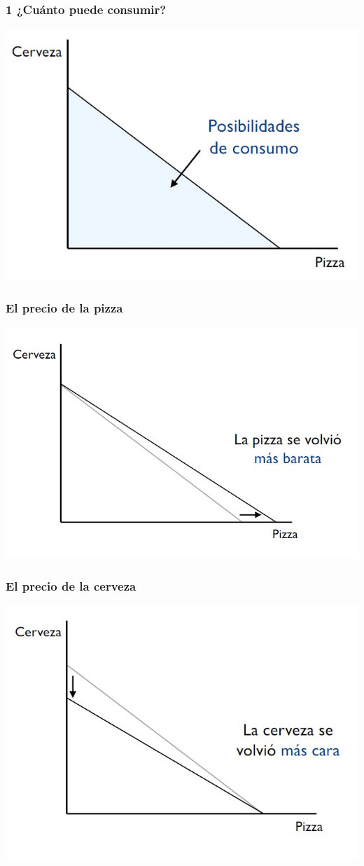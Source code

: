 \documentclass{beamer}
\begin{document}
\begin{frame}
\frametitle{1 ¿Cuánto puede consumir?}
\centering
\includegraphics[scale=0.6]{Figures/Tema_02.5_rp3.jpg}
\end{frame}

\begin{frame}
\frametitle{El precio de la pizza}
\centering
\includegraphics[scale=0.6]{Figures/Tema_02.6_rp4.jpg}
\end{frame}

\begin{frame}
\frametitle{El precio de la cerveza}
\centering
\includegraphics[scale=0.6]{Figures/Tema_02.7_rp5.jpg}
\end{frame}
\end{document}

